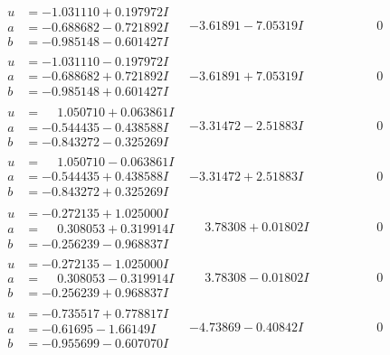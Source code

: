 \documentclass[1p]{elsarticle_modified}
\theoremstyle{definition}
\begin{document}
$$\begin{array}{c|c|c}
\begin{aligned}
u &= -1.031110 + 0.197972 I \\
a &= -0.688682 - 0.721892 I \\
b &= -0.985148 - 0.601427 I\end{aligned}
 & -3.61891 - 7.05319 I & \phantom{-0.000000 } 0 \\ \hline\begin{aligned}
u &= -1.031110 - 0.197972 I \\
a &= -0.688682 + 0.721892 I \\
b &= -0.985148 + 0.601427 I\end{aligned}
 & -3.61891 + 7.05319 I & \phantom{-0.000000 } 0 \\ \hline\begin{aligned}
u &= \phantom{-}1.050710 + 0.063861 I \\
a &= -0.544435 - 0.438588 I \\
b &= -0.843272 - 0.325269 I\end{aligned}
 & -3.31472 - 2.51883 I & \phantom{-0.000000 } 0 \\ \hline\begin{aligned}
u &= \phantom{-}1.050710 - 0.063861 I \\
a &= -0.544435 + 0.438588 I \\
b &= -0.843272 + 0.325269 I\end{aligned}
 & -3.31472 + 2.51883 I & \phantom{-0.000000 } 0 \\ \hline\begin{aligned}
u &= -0.272135 + 1.025000 I \\
a &= \phantom{-}0.308053 + 0.319914 I \\
b &= -0.256239 - 0.968837 I\end{aligned}
 & \phantom{-}3.78308 + 0.01802 I & \phantom{-0.000000 } 0 \\ \hline\begin{aligned}
u &= -0.272135 - 1.025000 I \\
a &= \phantom{-}0.308053 - 0.319914 I \\
b &= -0.256239 + 0.968837 I\end{aligned}
 & \phantom{-}3.78308 - 0.01802 I & \phantom{-0.000000 } 0 \\ \hline\begin{aligned}
u &= -0.735517 + 0.778817 I \\
a &= -0.61695 - 1.66149 I \\
b &= -0.955699 - 0.607070 I\end{aligned}
 & -4.73869 - 0.40842 I & \phantom{-0.000000 } 0 \\ \hline\begin{aligned}

\end{aligned}
\end{array}$$
\end{document}
